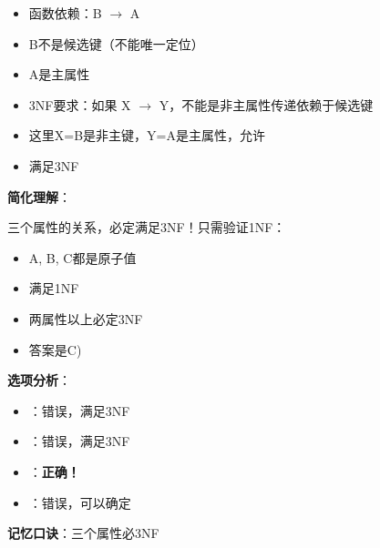 \documentclass[12pt, a4paper]{article}
\newenvironment{bluebox}[1]{%
  \begin{trivlist}
  \item[\hskip\labelsep \textbf{#1}]
  \setlength{\parskip}{0.5ex}
  \setlength{\itemsep}{0.5ex}
}{%
  \end{trivlist}
  }
\begin{document}
\begin{bluebox}{例题11：范式判定}
	\begin{itemize}
		\item 函数依赖：B $\to$ A
		\item B不是候选键（不能唯一定位）
		\item A是主属性
		\item 3NF要求：如果 X $\to$ Y，不能是非主属性传递依赖于候选键
		\item 这里X=B是非主键，Y=A是主属性，允许
		\item 满足3NF
	\end{itemize}

	\textbf{简化理解}：

	三个属性的关系，必定满足3NF！只需验证1NF：

	\begin{itemize}
		\item A, B, C都是原子值
		\item 满足1NF
		\item 两属性以上必定3NF
		\item 答案是C)
	\end{itemize}

	\textbf{选项分析}：
	\begin{itemize}[nosep]
		\item[A) 1NF]：错误，满足3NF
		\item[B) 2NF]：错误，满足3NF
		\item[C) 3NF]：\textbf{正确！}
		\item[D) 不确定]：错误，可以确定
	\end{itemize}

	\textbf{记忆口诀}：三个属性必3NF
\end{bluebox}
\end{document}
